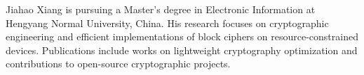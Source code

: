 \documentclass[journal]{IEEEtran}
\begin{document}








\begin{IEEEbiography}{Jiahao Xiang}
  is pursuing a Master's degree in Electronic Information at Hengyang Normal University, China. His research focuses on cryptographic engineering and efficient implementations of block ciphers on resource-constrained devices. Publications include works on lightweight cryptography optimization and contributions to open-source cryptographic projects.
\end{IEEEbiography}
\end{document}
